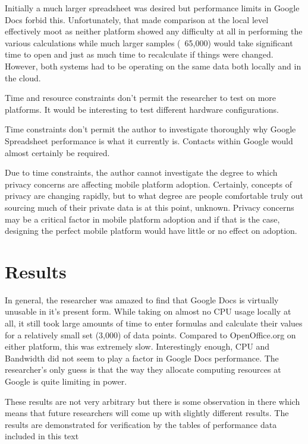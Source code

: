 Initially a much larger spreadsheet was desired but performance limits in Google
Docs forbid this.  Unfortunately, that made comparison at the local level
effectively moot as neither platform showed any difficulty at all in performing
the various calculations while much larger samples (~65,000) would take
significant time to open and just as much time to recalculate if things were
changed.  However, both systems had to be operating on the same data both
locally and in the cloud.

Time and resource constraints don't permit the researcher to test on more
platforms.  It would be interesting to test different hardware configurations.

Time constraints don't permit the author to investigate thoroughly why Google
Spreadsheet performance is what it currently is.  Contacts within Google would
almost certainly be required.

Due to time constraints, the author cannot investigate the degree to which
privacy concerns are affecting mobile platform adoption.  Certainly, concepts of
privacy are changing rapidly, but to what degree are people comfortable truly
out sourcing much of their private data is at this point, unknown.  Privacy
concerns may be a critical factor in mobile platform adoption and if that is the
case, designing the perfect mobile platform would have little or no effect on
adoption.

\section{Results}

In general, the researcher was amazed to find that Google Docs is virtually
unusable in it's present form.  While taking on almost no CPU usage locally at
all, it still took large amounts of time to enter formulas and calculate their
values for a relatively small set (3,000) of data points.  Compared to
OpenOffice.org on either platform, this was extremely slow.  Interestingly
enough, CPU and Bandwidth did not seem to play a factor in Google Docs
performance.  The researcher's only guess is that the way they allocate
computing resources at Google is quite limiting in power.

These results are not very arbitrary but there is some observation in there
which means that future researchers will come up with slightly different
results.  The results are demonstrated for verification by the tables of
performance data included in this text
